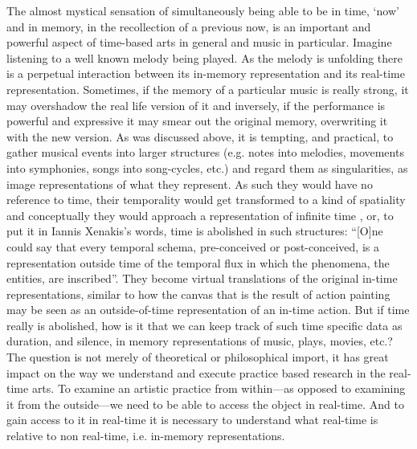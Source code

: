 The almost mystical sensation of simultaneously being able to be in time, `now' and in memory, in the recollection of a previous now, is an important and powerful aspect of time-based arts in general and music in particular. Imagine listening to a well known melody being played. As the melody is unfolding there is a perpetual interaction between its in-memory representation and its real-time representation. Sometimes, if the memory of a particular music is really strong, it may overshadow the real life version of it and inversely, if the performance is powerful and expressive it may smear out the original memory, overwriting it with the new version. As was discussed above, it is tempting, and practical, to gather musical events into larger structures (e.g. notes into melodies, movements into symphonies, songs into song-cycles, etc.) and regard them as singularities, as image representations of what they represent. As such they would have no reference to time, their temporality would get transformed to a kind of spatiality and conceptually they would approach a representation of infinite time \citep{roads}, or, to put it in Iannis Xenakis's words, time is abolished in such structures: ``[O]ne could say that every temporal schema, pre-conceived or post-conceived, is a representation outside time of the temporal flux in which the phenomena, the entities, are  inscribed''. \citep[264]{xenakis71} They become virtual translations of the original in-time representations, similar to how the canvas that is the result of action painting may be seen as an outside-of-time representation of an in-time action. But if time really is abolished, how is it that we can keep track of such time specific data as duration, and silence, in memory representations of music, plays, movies, etc.? The question is not merely of theoretical or philosophical import, it has great impact on the way we understand and execute practice based research in the real-time arts. To examine an artistic practice from within---as opposed to examining it from the outside---we need to be able to access the object in real-time. And to gain access to it in real-time it is necessary to understand what real-time is relative to non real-time, i.e. in-memory representations.


